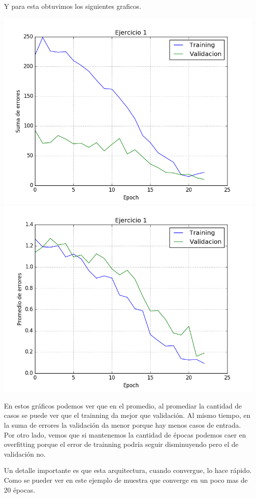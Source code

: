 Y para esta obtuvimos los siguientes graficos.


\includegraphics[scale=0.4]{img/ej100109155sum}
\includegraphics[scale=0.4]{img/ej100109155mean}

En estos gráficos podemos ver que en el promedio, al promediar la cantidad de casos se puede ver que el trainning da mejor que validación. Al mismo tiempo, en la suma de errores la validación da menor porque hay menos casos de entrada. 
Por otro lado, vemos que si mantenemos la cantidad de épocas podemos caer en overfitting porque el error de trainning podría seguir disminuyendo pero el de validación no.

Un detalle importante es que esta arquitectura, cuando convergue, lo hace rápido. Como se pueder ver en este ejemplo de muestra que converge en un poco mas de 20 épocas.

